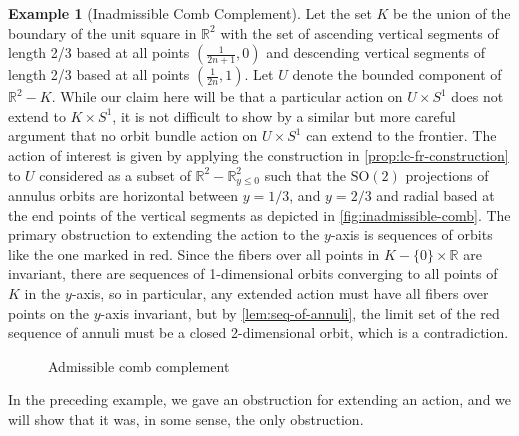 \documentclass[10pt, oneside]{article}
\newcommand{\R}{\mathbb{R}}
\newcommand{\SO}[1][2]{\text{SO}(#1)}
\theoremstyle{definition}
\newtheorem{eg}{Example}[section]
\theoremstyle{definition}
\begin{document}
\begin{eg}[Inadmissible Comb Complement]
    Let the set $K$ be the union of the boundary of the unit square in $\R^2$ with the set of ascending vertical segments of length 2/3 based at all points $(\frac{1}{2n+1}, 0)$ and descending vertical segments of length 2/3 based at all points $(\frac{1}{2n}, 1)$. Let $U$ denote the bounded component of $\R^2 - K$. While our claim here will be that a particular action on $U\times S^1$ does not extend to $K\times S^1$, it is not difficult to show by a similar but more careful argument that no orbit bundle action on $U\times S^1$ can extend to the frontier. The action of interest is given by applying the construction in \cref{prop:lc-fr-construction} to $U$ considered as a subset of $\R^2 - \R^2_{y\leq 0}$ such that the $\SO$ projections of annulus orbits are horizontal between $y=1/3$, and $y=2/3$ and radial based at the end points of the vertical segments as depicted in \cref{fig:inadmissible-comb}. The primary obstruction to extending the action to the $y$-axis is sequences of orbits like the one marked in red. Since the fibers over all points in $K-\{0\}\times\R$ are invariant, there are sequences of 1-dimensional orbits converging to all points of $K$ in the $y$-axis, so in particular, any extended action must have all fibers over points on the $y$-axis invariant, but by \cref{lem:seq-of-annuli}, the limit set of the red sequence of annuli must be a closed 2-dimensional orbit, which is a contradiction.
\end{eg}

\begin{figure}
\centering
\begin{minipage}{.5\textwidth}
  \centering
  
  \caption{Inadmissible comb complement}
  \label{fig:inadmissible-comb}
\end{minipage}%
\begin{minipage}{.5\textwidth}
  \centering
  
  \caption{Admissible comb complement}
  \label{fig:admissible-comb}
\end{minipage}
\end{figure}

In the preceding example, we gave an obstruction for extending an action, and we will show that it was, in some sense, the only obstruction.
\end{document}
